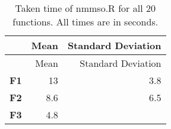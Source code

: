 \documentclass[12pt,a4paper]{article}
\begin{document}
\begin{longtable}[c]{@{}crr@{}}
\caption{Taken time of nmmso.R for all 20 functions. All times are in
seconds.}\tabularnewline
\toprule
\begin{minipage}[b]{0.13\columnwidth}\centering\strut
~
\strut\end{minipage} &
\begin{minipage}[b]{0.09\columnwidth}\raggedleft\strut
Mean
\strut\end{minipage} &
\begin{minipage}[b]{0.25\columnwidth}\raggedleft\strut
Standard Deviation
\strut\end{minipage}\tabularnewline
\midrule
\endfirsthead
\toprule
\begin{minipage}[b]{0.13\columnwidth}\centering\strut
~
\strut\end{minipage} &
\begin{minipage}[b]{0.09\columnwidth}\raggedleft\strut
Mean
\strut\end{minipage} &
\begin{minipage}[b]{0.25\columnwidth}\raggedleft\strut
Standard Deviation
\strut\end{minipage}\tabularnewline
\midrule
\endhead
\begin{minipage}[t]{0.13\columnwidth}\centering\strut
\textbf{F1}
\strut\end{minipage} &
\begin{minipage}[t]{0.09\columnwidth}\raggedleft\strut
13
\strut\end{minipage} &
\begin{minipage}[t]{0.25\columnwidth}\raggedleft\strut
3.8
\strut\end{minipage}\tabularnewline
\begin{minipage}[t]{0.13\columnwidth}\centering\strut
\textbf{F2}
\strut\end{minipage} &
\begin{minipage}[t]{0.09\columnwidth}\raggedleft\strut
8.6
\strut\end{minipage} &
\begin{minipage}[t]{0.25\columnwidth}\raggedleft\strut
6.5
\strut\end{minipage}\tabularnewline
\begin{minipage}[t]{0.13\columnwidth}\centering\strut
\textbf{F3}
\strut\end{minipage} &
\begin{minipage}[t]{0.09\columnwidth}\raggedleft\strut
4.8
\strut\end{minipage} &
\begin{minipage}[t]{0.25\columnwidth}\raggedleft\strut

\end{minipage}
\end{longtable}
\end{document}
